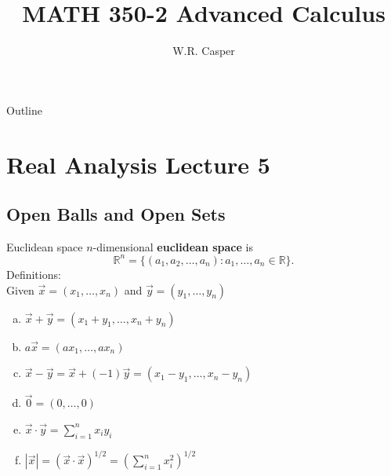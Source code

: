 \documentclass{beamer}
\title{MATH 350-2 Advanced Calculus}
\subtitle
{} %
\author[W.R. Casper] %
{W.R. Casper}
\institute[California State University Fullerton] %
{
  Department of Mathematics\\
  California State University Fullerton}
\begin{document}
\begin{frame}
  \titlepage
\end{frame}

\begin{frame}{Outline}
  \tableofcontents
\end{frame}



\section{Real Analysis Lecture 5}

\subsection{Open Balls and Open Sets}

\begin{frame}{Euclidean space}
\pause
$n$-dimensional \textbf{euclidean space} is
\pause
$$\mathbb{R}^n = \{(a_1,a_2,\dots,a_n): a_1,\dots, a_n\in\mathbb{R}\}.$$
\pause
Definitions:\\
\pause
Given $\vec x = (x_1,\dots, x_n)$ and $\vec y = (y_1,\dots, y_n)$
\begin{enumerate}[(a)]
\pause
\item $\vec x + \vec y = (x_1+y_1,\dots,x_n+y_n)$
\pause
\item $a\vec x = (ax_1,\dots, ax_n)$
\pause
\item $\vec x - \vec y = \vec x + (-1)\vec y = (x_1-y_1,\dots,x_n-y_n)$
\pause
\item $\vec 0 = (0,\dots, 0)$
\pause
\item $\vec x\cdot\vec y = \sum_{i=1}^n x_iy_i$
\pause
\item $|\vec x| = (\vec x\cdot\vec x)^{1/2} = \left(\sum_{i=1}^nx_i^2\right)^{1/2}$
\end{enumerate}
\end{frame}
\end{document}

